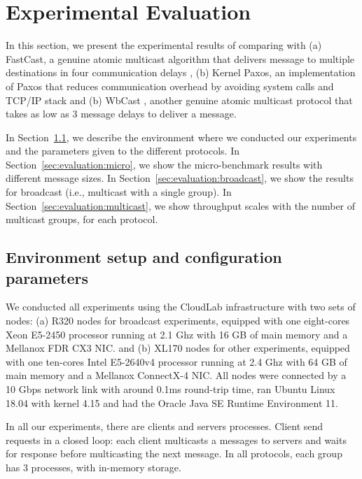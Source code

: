 \section{Experimental Evaluation}
\label{sec:experimental-evaluation}

In this section, we present the experimental results of comparing \libname with
(a) FastCast, a genuine atomic multicast algorithm that delivers message to
multiple destinations in four communication delays \cite{coelho2017fast}, (b)
Kernel Paxos, an implementation of Paxos that reduces communication overhead by
avoiding system calls and TCP/IP stack \cite{esposito2018kernel} and (b) WbCast
\cite{gotsman2019white}, another genuine atomic multicast protocol that takes as
low as 3 message delays to deliver a message.

In Section~\ref{sec:evaluation:setup}, we describe the environment where we conducted our experiments and the parameters given to the different protocols.
In Section~\ref{sec:evaluation:micro}, we show the micro-benchmark results with different message sizes.
In Section~\ref{sec:evaluation:broadcast}, we show the results for broadcast (i.e., multicast with a single group).
In Section~\ref{sec:evaluation:multicast}, we show throughput scales with the number of multicast groups, for each protocol.


\subsection{Environment setup and configuration parameters}
\label{sec:evaluation:setup}

We conducted all experiments using the CloudLab infrastructure \cite{ricci2014introducing} with two sets of nodes: 
(a) R320 nodes for broadcast experiments, equipped with one eight-cores Xeon E5-2450 processor running at 2.1 Ghz with 16 GB of main memory and a Mellanox FDR CX3 NIC.
and (b) XL170 nodes for other experiments, equipped with one ten-cores Intel E5-2640v4 processor running at 2.4 Ghz with 64 GB of main memory and a Mellanox ConnectX-4 NIC. 
All nodes were connected by a 10 Gbps network link with around 0.1ms round-trip time, ran Ubuntu Linux 18.04 with kernel 4.15 and had the Oracle Java SE Runtime Environment 11. 

In all our experiments, there are clients and servers processes. Client send requests in a closed loop: each client multicasts a messages to servers and waits for response before multicasting the next message. In all protocols, each group has 3 processes, with in-memory storage.



